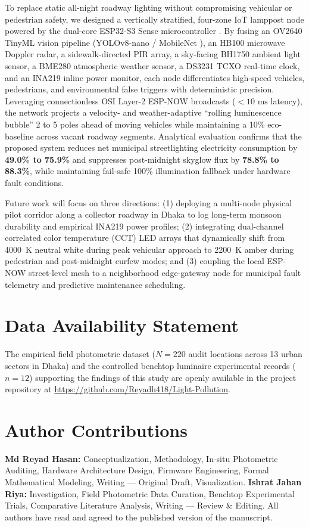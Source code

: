 \documentclass[11pt,a4paper]{article}
\begin{document}
To replace static all-night roadway lighting without compromising vehicular or pedestrian safety, we designed a vertically stratified, four-zone IoT lamppost node powered by the dual-core ESP32-S3 Sense microcontroller \cite{espressif_esp32s3}. By fusing an OV2640 TinyML vision pipeline (YOLOv8-nano \cite{redmon_yolo} / MobileNet \cite{howard2017mobilenets}), an HB100 microwave Doppler radar, a sidewalk-directed PIR array, a sky-facing BH1750 ambient light sensor, a BME280 atmospheric weather sensor, a DS3231 TCXO real-time clock, and an INA219 inline power monitor, each node differentiates high-speed vehicles, pedestrians, and environmental false triggers with deterministic precision. Leveraging connectionless OSI Layer-2 ESP-NOW broadcasts \cite{espressif_espnow} (\(<10\text{ ms}\) latency), the network projects a velocity- and weather-adaptive ``rolling luminescence bubble'' 2 to 5 poles ahead of moving vehicles while maintaining a 10\% eco-baseline across vacant roadway segments. Analytical evaluation confirms that the proposed system reduces net municipal streetlighting electricity consumption by \textbf{49.0\% to 75.9\%} and suppresses post-midnight skyglow flux by \textbf{78.8\% to 88.3\%}, while maintaining fail-safe 100\% illumination fallback under hardware fault conditions.

Future work will focus on three directions: (1) deploying a multi-node physical pilot corridor along a collector roadway in Dhaka to log long-term monsoon durability and empirical INA219 power profiles; (2) integrating dual-channel correlated color temperature (CCT) LED arrays that dynamically shift from 4000~K neutral white during peak vehicular approach to 2200~K amber during pedestrian and post-midnight curfew modes; and (3) coupling the local ESP-NOW street-level mesh to a neighborhood edge-gateway node for municipal fault telemetry and predictive maintenance scheduling.

\section*{Data Availability Statement}
The empirical field photometric dataset (\(N = 220\) audit locations across 13 urban sectors in Dhaka) and the controlled benchtop luminaire experimental records (\(n = 12\)) supporting the findings of this study are openly available in the project repository at \url{https://github.com/Reyadh418/Light-Pollution}.

\section*{Author Contributions}
\textbf{Md Reyad Hasan:} Conceptualization, Methodology, In-situ Photometric Auditing, Hardware Architecture Design, Firmware Engineering, Formal Mathematical Modeling, Writing --- Original Draft, Visualization. \textbf{Ishrat Jahan Riya:} Investigation, Field Photometric Data Curation, Benchtop Experimental Trials, Comparative Literature Analysis, Writing --- Review \& Editing. All authors have read and agreed to the published version of the manuscript.
\end{document}

